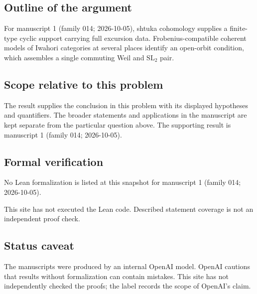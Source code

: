 \documentclass[11pt]{article}
\begin{document}
\subsection{Outline of the argument}
For manuscript 1 (family 014; 2026-10-05), shtuka cohomology supplies a finite-type cyclic support carrying full excursion data. Frobenius-compatible coherent models of Iwahori categories at several places identify an open-orbit condition, which assembles a single commuting Weil and $\mathrm{SL}_2$ pair.

\subsection{Scope relative to this problem}
The result supplies the conclusion in this problem with its displayed hypotheses and quantifiers. The broader statements and applications in the manuscript are kept separate from the particular question above. The supporting result is manuscript 1 (family 014; 2026-10-05).

\subsection{Formal verification}
No Lean formalization is listed at this snapshot for manuscript 1 (family 014; 2026-10-05).

This site has not executed the Lean code. Described statement coverage is not an independent proof check.

\subsection{Status caveat}
The manuscripts were produced by an internal OpenAI model. OpenAI cautions that results without formalization can contain mistakes. This site has not independently checked the proofs; the label records the scope of OpenAI's claim.
\end{document}
